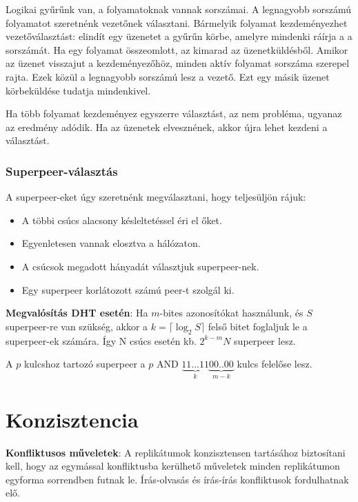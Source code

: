 \documentclass[margin=0px]{article}
\begin{document}
Logikai gyűrűnk van, a folyamatoknak vannak sorszámai. A legnagyobb sorszámú folyamatot szeretnénk vezetőnek választani.
Bármelyik folyamat kezdeményezhet vezetőválasztást: elindít egy üzenetet a gyűrűn körbe, amelyre mindenki ráírja a
a sorszámát. Ha egy folyamat összeomlott, az kimarad az üzenetküldésből. Amikor az üzenet visszajut a kezdeményezőhöz,
minden aktív folyamat sorszáma szerepel rajta. Ezek közül a legnagyobb sorszámú lesz a vezető. Ezt egy másik
üzenet körbeküldése tudatja mindenkivel.

Ha több folyamat kezdeményez egyszerre választást, az nem probléma, ugyanaz az eredmény adódik. Ha az üzenetek
elvesznének, akkor újra lehet kezdeni a választást.

\subsubsection{Superpeer-választás}

A superpeer-eket úgy szeretnénk megválasztani, hogy teljesüljön rájuk:

\begin{itemize}
    \item	A többi csúcs alacsony késleltetéssel éri el őket.
    \item	Egyenletesen vannak elosztva a hálózaton.
    \item	A csúcsok megadott hányadát választjuk superpeer-nek.
    \item	Egy superpeer korlátozott számú peer-t szolgál ki.
\end{itemize}

\noindent \textbf{Megvalósítás DHT esetén}: Ha $m$-bites azonosítókat használunk, és $S$ superpeer-re van szükség, akkor
a $k= \lceil \log_{2} S \rceil$ felső bitet foglaljuk le a superpeer-ek számára. Így N csúcs esetén kb. $2^{k-m}N$
superpeer lesz.

A $p$ kulcshoz tartozó superpeer a $p$ AND $\underbrace{11...11}_{k}\underbrace{00..00}_{m-k}$ kulcs felelőse lesz.

\section{Konzisztencia}

\noindent \textbf{Konfliktusos műveletek}: A replikátumok konzisztensen tartásához biztosítani kell, hogy az egymással
konfliktusba kerülhető műveletek minden replikátumon egyforma sorrendben futnak le. Írás-olvasás és írás-írás
konfliktusok fordulhatnak elő.\\
\end{document}

